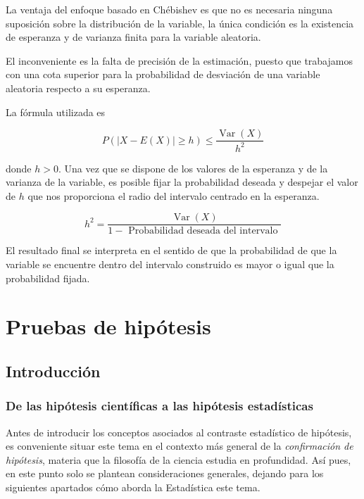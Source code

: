 \documentclass[
]{article}
\begin{document}
La ventaja del enfoque basado en Chébishev es que no es necesaria ninguna suposición sobre la distribución de la variable, la única condición es la existencia de esperanza y de varianza finita para la variable aleatoria.

El inconveniente es la falta de precisión de la estimación, puesto que trabajamos con una cota superior para la probabilidad de desviación de una variable aleatoria respecto a su esperanza.

La fórmula utilizada es

\[
P(|X-E(X)| \geq h) \leq \frac{\operatorname{Var}(X)}{h^{2}}
\]

donde \(h>0\).
Una vez que se dispone de los valores de la esperanza y de la varianza de la variable, es posible fijar la probabilidad deseada y despejar el valor de \(h\) que nos proporciona el radio del intervalo centrado en la esperanza.

\[
h^{2}=\frac{\operatorname{Var}(X)}{1-\text { Probabilidad deseada del intervalo }}
\]

El resultado final se interpreta en el sentido de que la probabilidad de que la variable se encuentre dentro del intervalo construido es mayor o igual que la probabilidad fijada.

\newpage

\section{Pruebas de hipótesis}\label{pruebas-de-hipuxf3tesis}

\subsection{Introducción}\label{introducciuxf3n-2}

\subsubsection{De las hipótesis científicas a las hipótesis estadísticas}\label{de-las-hipuxf3tesis-cientuxedficas-a-las-hipuxf3tesis-estaduxedsticas}

Antes de introducir los conceptos asociados al contraste estadístico de hipótesis, es conveniente situar este tema en el contexto más general de la \emph{confirmación de hipótesis}, materia que la filosofía de la ciencia estudia en profundidad. Así pues, en este punto solo se plantean consideraciones generales, dejando para los siguientes apartados cómo aborda la Estadística este tema.
\end{document}
